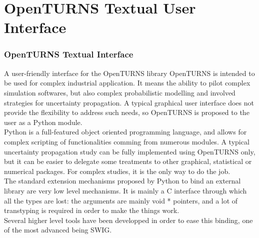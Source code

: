 \documentclass[8pt]{beamer}
\begin{document}
\section[OpenTURNS TUI]{OpenTURNS Textual User Interface}
\begin{frame}
  \frametitle{OpenTURNS Textual Interface}
  \begin{block}{A user-friendly interface for the OpenTURNS library}
    OpenTURNS is intended to be used for complex industrial application. It means the ability to pilot complex simulation softwares, but also complex probabilistic modelling and involved strategies for uncertainty propagation. A typical graphical user interface does not provide the flexibility to address such needs, so OpenTURNS is proposed to the user as a Python module.\\
    Python is a full-featured object oriented programming language, and allows for complex scripting of functionalities comming from numerous modules. A typical uncertainty propagation study can be fully implemented using OpenTURNS only, but it can be easier to delegate some treatments to other graphical, statistical or numerical packages. For complex studies, it is the only way to do the job.\\
    The standard extension mechanisms proposed by Python to bind an external library are very low level mechanisms. It is mainly a C interface through which all the types are lost: the arguments are mainly {\ttfamily void *} pointers, and a lot of transtyping is required in order to make the things work.\\
    Several higher level tools have been developped in order to ease this binding, one of the most advanced being SWIG.
  \end{block}
\end{frame}
\end{document}
